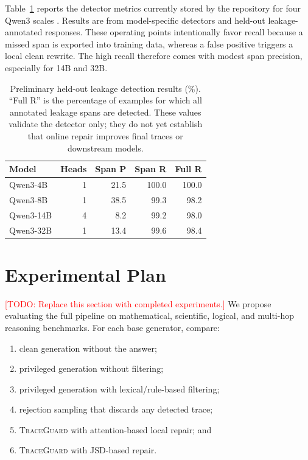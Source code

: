 \documentclass[11pt]{article}
\newcommand{\method}{\textsc{TraceGuard}\xspace}
\newcommand{\todo}[1]{\textcolor{red}{[TODO: #1]}}
\begin{document}
Table~\ref{tab:detector} reports the detector metrics currently stored by the
repository for four Qwen3 scales \citep{yang2025qwen3}.  Results are from model-specific detectors and
held-out leakage-annotated responses.  These operating points intentionally
favor recall because a missed span is exported into training data, whereas a
false positive triggers a local clean rewrite.  The high recall therefore comes
with modest span precision, especially for 14B and 32B.

\begin{table}[t]
\centering
\small
\begin{tabular}{lrrrr}
\toprule
Model & Heads & Span P & Span R & Full R \\
\midrule
Qwen3-4B  & 1 & 21.5 & 100.0 & 100.0 \\
Qwen3-8B  & 1 & 38.5 & 99.3  & 98.2 \\
Qwen3-14B & 4 & 8.2  & 99.2  & 98.0 \\
Qwen3-32B & 1 & 13.4 & 99.6  & 98.4 \\
\bottomrule
\end{tabular}
\caption{Preliminary held-out leakage detection results (\%). ``Full R'' is the
percentage of examples for which all annotated leakage spans are detected.
These values validate the detector only; they do not yet establish that online
repair improves final traces or downstream models.}
\label{tab:detector}
\end{table}

\section{Experimental Plan}
\label{sec:experiments}

\todo{Replace this section with completed experiments.}  We propose evaluating
the full pipeline on mathematical, scientific, logical, and multi-hop reasoning
benchmarks.  For each base generator, compare:

\begin{enumerate}
    \item clean generation without the answer;
    \item privileged generation without filtering;
    \item privileged generation with lexical/rule-based filtering;
    \item rejection sampling that discards any detected trace;
    \item \method with attention-based local repair; and
    \item \method with JSD-based repair.
\end{enumerate}
\end{document}
